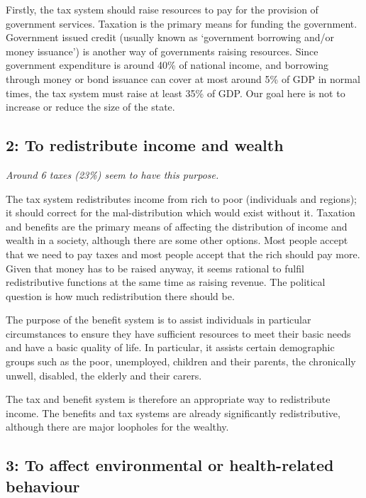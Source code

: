 \documentclass[]{tufte-handout}
\begin{document}
Firstly, the tax system should raise resources to pay for the provision
of government services. Taxation is the primary means for funding the
government. Government issued credit (usually known as `government
borrowing and/or money issuance') is another way of governments raising
resources. Since government expenditure is around 40\% of national
income, and borrowing through money or bond issuance can cover at most
around 5\% of GDP in normal times, the tax system must raise at least
35\% of GDP. Our goal here is not to increase or reduce the size of the
state.

\hypertarget{to-redistribute-income-and-wealth}{%
\subsection{2: To redistribute income and
wealth}\label{to-redistribute-income-and-wealth}}

\emph{Around 6 taxes (23\%) seem to have this purpose.}

The tax system redistributes income from rich to poor (individuals and
regions); it should correct for the mal-distribution which would exist
without it. Taxation and benefits are the primary means of affecting the
distribution of income and wealth in a society, although there are some
other options. Most people accept that we need to pay taxes and most
people accept that the rich should pay more. Given that money has to be
raised anyway, it seems rational to fulfil redistributive functions at
the same time as raising revenue. The political question is how much
redistribution there should be.

The purpose of the benefit system is to assist individuals in particular
circumstances to ensure they have sufficient resources to meet their
basic needs and have a basic quality of life. In particular, it assists
certain demographic groups such as the poor, unemployed, children and
their parents, the chronically unwell, disabled, the elderly and their
carers.

The tax and benefit system is therefore an appropriate way to
redistribute income. The benefits and tax systems are already
significantly redistributive, although there are major loopholes for the
wealthy.

\hypertarget{to-affect-environmental-or-health-related-behaviour}{%
\subsection{3: To affect environmental or health-related
behaviour}\label{to-affect-environmental-or-health-related-behaviour}}
\end{document}
